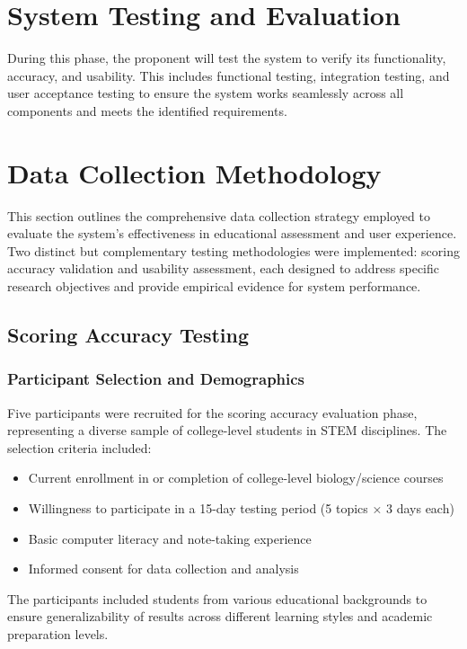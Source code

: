 \section{System Testing and Evaluation}

During this phase, the proponent will test the system to verify its functionality, accuracy, and usability. This includes functional testing, integration testing, and user acceptance testing to ensure the system works seamlessly across all components and meets the identified requirements.

\section{Data Collection Methodology}

This section outlines the comprehensive data collection strategy employed to evaluate the system's effectiveness in educational assessment and user experience. Two distinct but complementary testing methodologies were implemented: scoring accuracy validation and usability assessment, each designed to address specific research objectives and provide empirical evidence for system performance.

\subsection{Scoring Accuracy Testing}

\subsubsection{Participant Selection and Demographics}

Five participants were recruited for the scoring accuracy evaluation phase, representing a diverse sample of college-level students in STEM disciplines. The selection criteria included:

\begin{itemize}
    \item Current enrollment in or completion of college-level biology/science courses
    \item Willingness to participate in a 15-day testing period (5 topics × 3 days each)
    \item Basic computer literacy and note-taking experience
    \item Informed consent for data collection and analysis
\end{itemize}

The participants included students from various educational backgrounds to ensure generalizability of results across different learning styles and academic preparation levels.

